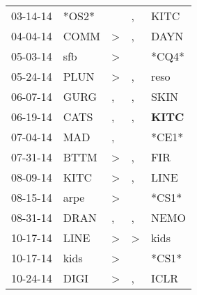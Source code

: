 \begin{supertabular}{p{0.07\textwidth}p{0.06\textwidth}p{0.02\textwidth}p{0.02\textwidth}p{0.06\textwidth}}
          03-14-14\textsuperscript{} &                            *OS2* &                  &                , &           KITC\textsuperscript{} \\
          04-04-14\textsuperscript{} &           COMM\textsuperscript{} &     \textgreater &                , &           DAYN\textsuperscript{} \\
          05-03-14\textsuperscript{} &            sfb\textsuperscript{} &     \textgreater &                  &                            *CQ4* \\
          05-24-14\textsuperscript{} &           PLUN\textsuperscript{} &     \textgreater &                , &           reso\textsuperscript{} \\
          06-07-14\textsuperscript{} &           GURG\textsuperscript{} &                , &                , &           SKIN\textsuperscript{} \\
          06-19-14\textsuperscript{} &           CATS\textsuperscript{} &                , &                , &  \textbf{KITC\textsuperscript{}} \\
          07-04-14\textsuperscript{} &            MAD\textsuperscript{} &                , &                  &                            *CE1* \\
          07-31-14\textsuperscript{} &           BTTM\textsuperscript{} &     \textgreater &                , &            FIR\textsuperscript{} \\
          08-09-14\textsuperscript{} &           KITC\textsuperscript{} &     \textgreater &                , &           LINE\textsuperscript{} \\
          08-15-14\textsuperscript{} &           arpe\textsuperscript{} &     \textgreater &                  &                            *CS1* \\
          08-31-14\textsuperscript{} &           DRAN\textsuperscript{} &                , &                , &           NEMO\textsuperscript{} \\
          10-17-14\textsuperscript{} &           LINE\textsuperscript{} &     \textgreater &     \textgreater &           kids\textsuperscript{} \\
          10-17-14\textsuperscript{} &           kids\textsuperscript{} &     \textgreater &                  &                            *CS1* \\
          10-24-14\textsuperscript{} &           DIGI\textsuperscript{} &     \textgreater &                , &           ICLR\textsuperscript{} \\

\end{supertabular}
